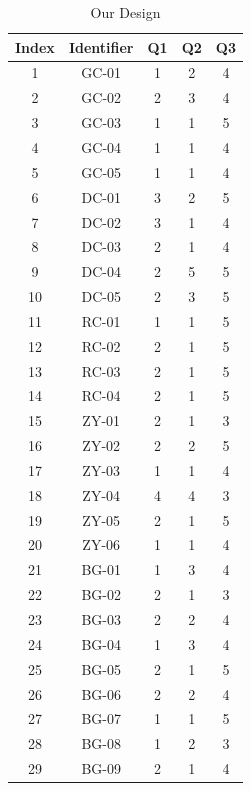 \documentclass[acmsmall,screen,authorversion,nonacm]{acmart}
\begin{document}
\begin{center}
    \begin{table}[H]
    \begin{tabular}{|c|c|c|c|c|}
    \hline
    Index & Identifier & Q1 & Q2 & Q3 \\ \hline
    1     & GC-01      & 1  & 2  & 4  \\ \hline
    2     & GC-02      & 2  & 3  & 4  \\ \hline
    3     & GC-03      & 1  & 1  & 5  \\ \hline
    4     & GC-04      & 1  & 1  & 4  \\ \hline
    5     & GC-05      & 1  & 1  & 4  \\ \hline
    6     & DC-01      & 3  & 2  & 5  \\ \hline
    7     & DC-02      & 3  & 1  & 4  \\ \hline
    8     & DC-03      & 2  & 1  & 4  \\ \hline
    9     & DC-04      & 2  & 5  & 5  \\ \hline
    10    & DC-05      & 2  & 3  & 5  \\ \hline
    11    & RC-01      & 1  & 1  & 5  \\ \hline
    12    & RC-02      & 2  & 1  & 5  \\ \hline
    13    & RC-03      & 2  & 1  & 5  \\ \hline
    14    & RC-04      & 2  & 1  & 5  \\ \hline
    15    & ZY-01      & 2  & 1  & 3  \\ \hline
    16    & ZY-02      & 2  & 2  & 5  \\ \hline
    17    & ZY-03      & 1  & 1  & 4  \\ \hline
    18    & ZY-04      & 4  & 4  & 3  \\ \hline
    19    & ZY-05      & 2  & 1  & 5  \\ \hline
    20    & ZY-06      & 1  & 1  & 4  \\ \hline
    21    & BG-01      & 1  & 3  & 4  \\ \hline
    22    & BG-02      & 2  & 1  & 3  \\ \hline
    23    & BG-03      & 2  & 2  & 4  \\ \hline
    24    & BG-04      & 1  & 3  & 4  \\ \hline
    25    & BG-05      & 2  & 1  & 5  \\ \hline
    26    & BG-06      & 2  & 2  & 4  \\ \hline
    27    & BG-07      & 1  & 1  & 5  \\ \hline
    28    & BG-08      & 1  & 2  & 3  \\ \hline
    29    & BG-09      & 2  & 1  & 4  \\ \hline
    \end{tabular}
    \caption{Our Design}
    \end{table}
\end{center}
\end{document}
